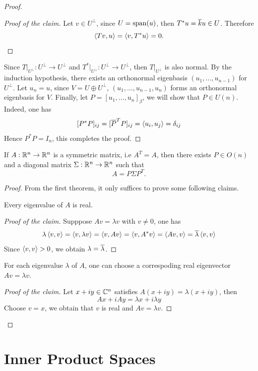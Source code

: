 ﻿\documentclass[12pt]{article}
\begin{document}
\begin{proof}
\begin{proof}[Proof of the claim]
        Let $v \in U^\bot$, since $U = \mathrm{span}(u)$, then $T^*u = \overline{k}u \in U$. Therefore
        \[
            \left\langle Tv, u \right\rangle  = \left\langle v, T^*u \right\rangle  = 0.
        \]
    \end{proof}
     Since $T|_{U^\bot}: U^\bot \to U^\bot$ and  $T^*|_{U^\bot}: U^\bot \to U^\bot$, then $T|_{U^\bot}$ is also normal.
 By the induction hypothesis, there exists an orthonormal eigenbasis $(u_1,\dots, u_{n - 1})$ for $U^\bot$. Let $u_n = u$, since $V = U \oplus U^\bot$, $(u_1,\dots, u_{n- 1},u_n)$ forms an orthonormal eigenbasis for $V$. Finally, let $P = [u_1,\dots, u_n]_{\beta}$, we will show that $P \in U(n)$. Indeed, one has 
    \[
        [P^*P]_{ij } = [\overline{P}^TP]_{ij} = \left\langle  u_i, u_j \right\rangle =  \delta_{ij}
    \]
    Hence $P^*P = I_n$, this completes the proof.
\end{proof}
\begin{theorem}
    If $A: \mathbb{R}^n \to \mathbb{R}^n$ is a symmetric matrix, i.e $A^T = A$, then there exists $P \in O(n)$ and a diagonal matrix $\Sigma: \mathbb{R}^n \to \mathbb{R}^n$ such that 
    \[
        A = P\Sigma P^T.
    \]
\end{theorem}
\begin{proof}
    From the first theorem, it only suffices to prove some following claims.
    \begin{claim}
        Every eigenvalue  of $A$ is real.
    \end{claim}
    \begin{proof}[Proof of the claim]
        Supppose $Av = \lambda v$ with $v \neq 0$, one has 
        \[
            \lambda \left\langle v,v \right\rangle=  \left\langle  v,\lambda v \right\rangle = \left\langle v,Av \right\rangle = \left\langle v, A^*v \right\rangle = \left\langle Av, v \right\rangle = \overline{\lambda}\left\langle v, v \right\rangle 
        \]
        Since $\left\langle v,v \right\rangle > 0$, we obtain $\lambda = \overline{\lambda}$.
    \end{proof}
    \begin{claim}
        For each eigenvalue $\lambda$ of $A$, one can choose a correspoding real eigenvector $A v = \lambda v$.
    \end{claim}
    \begin{proof}[Proof of the claim]
        Let $x + iy \in \mathbb{C}^n$ satisfies $A (x + iy)= \lambda (x + iy)$, then 
        \[
            Ax + i Ay = \lambda x + i \lambda y
        \]
        Choose $v = x$, we obtain that $v$ is real and $Av = \lambda v$.
    \end{proof}
\end{proof}
\section{Inner Product Spaces}
\end{document}
